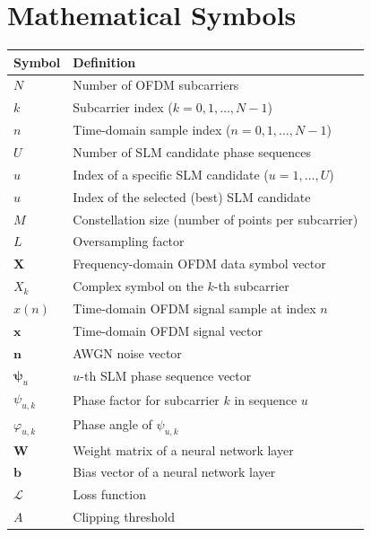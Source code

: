 \chapter*{Mathematical Symbols}
\label{ch:mathematical_symbols}

\begin{center}
\begin{tabular}{l l}
\toprule
    \textbf{Symbol} & \textbf{Definition} \\
\midrule
$N$                & Number of OFDM subcarriers \\
$k$                & Subcarrier index ($k = 0, 1, \dots, N-1$) \\
$n$                & Time-domain sample index ($n = 0, 1, \dots, N-1$) \\
$U$                & Number of SLM candidate phase sequences \\
$u$                & Index of a specific SLM candidate ($u = 1, \dots, U$) \\
$\hat{u}$          & Index of the selected (best) SLM candidate \\
$M$                & Constellation size (number of points per subcarrier) \\
$L$                & Oversampling factor \\
$\bm{X}$           & Frequency-domain OFDM data symbol vector \\
$X_k$              & Complex symbol on the $k$-th subcarrier \\
$x(n)$             & Time-domain OFDM signal sample at index $n$ \\
$\bm{x}$           & Time-domain OFDM signal vector \\
$\bm{n}$           & AWGN noise vector \\
$\bm{\psi}_u$      & $u$-th SLM phase sequence vector \\
$\psi_{u,k}$       & Phase factor for subcarrier $k$ in sequence $u$ \\
$\varphi_{u,k}$    & Phase angle of $\psi_{u,k}$ \\
$\bm{W}$           & Weight matrix of a neural network layer \\
$\bm{b}$           & Bias vector of a neural network layer \\
$\mathcal{L}$      & Loss function \\
$A$                & Clipping threshold \\
\bottomrule
\end{tabular}


\end{center}
